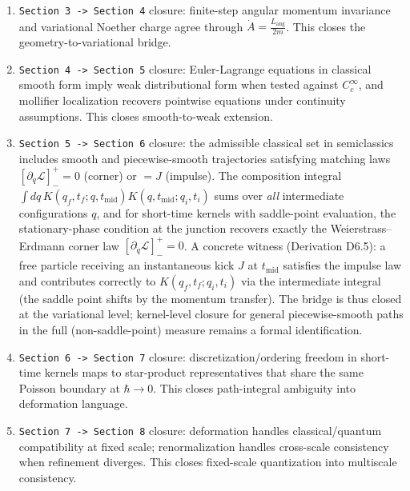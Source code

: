 \documentclass[
]{article}
\begin{document}
\begin{enumerate}
\def\labelenumi{\arabic{enumi}.}
\item
  \texttt{Section\ 3\ -\textgreater{}\ Section\ 4} closure: finite-step
  angular momentum invariance and variational Noether charge agree
  through \(\dot A=\frac{L_{\mathrm{ang}}}{2m}\). This closes the
  geometry-to-variational bridge.
\item
  \texttt{Section\ 4\ -\textgreater{}\ Section\ 5} closure:
  Euler-Lagrange equations in classical smooth form imply weak
  distributional form when tested against \(C_c^\infty\), and mollifier
  localization recovers pointwise equations under continuity
  assumptions. This closes smooth-to-weak extension.
\item
  \texttt{Section\ 5\ -\textgreater{}\ Section\ 6} closure: the
  admissible classical set in semiclassics includes smooth and
  piecewise-smooth trajectories satisfying matching laws
  \([\partial_{\dot q}\mathcal L]^+_- =0\) (corner) or \(=J\) (impulse).
  The composition integral
  \(\int dq\,K(q_f,t_f;q,t_{\mathrm{mid}})K(q,t_{\mathrm{mid}};q_i,t_i)\)
  sums over \emph{all} intermediate configurations \(q\), and for
  short-time kernels with saddle-point evaluation, the stationary-phase
  condition at the junction recovers exactly the Weierstrass--Erdmann
  corner law \([\partial_{\dot q}\mathcal L]^+_-=0\). A concrete witness
  (Derivation D6.5): a free particle receiving an instantaneous kick
  \(J\) at \(t_{\mathrm{mid}}\) satisfies the impulse law and
  contributes correctly to \(K(q_f,t_f;q_i,t_i)\) via the intermediate
  integral (the saddle point shifts by the momentum transfer). The
  bridge is thus closed at the variational level; kernel-level closure
  for general piecewise-smooth paths in the full (non-saddle-point)
  measure remains a formal identification.
\item
  \texttt{Section\ 6\ -\textgreater{}\ Section\ 7} closure:
  discretization/ordering freedom in short-time kernels maps to
  star-product representatives that share the same Poisson boundary at
  \(\hbar\to0\). This closes path-integral ambiguity into deformation
  language.
\item
  \texttt{Section\ 7\ -\textgreater{}\ Section\ 8} closure: deformation
  handles classical/quantum compatibility at fixed scale;
  renormalization handles cross-scale consistency when refinement
  diverges. This closes fixed-scale quantization into multiscale
  consistency.
\end{enumerate}
\end{document}
